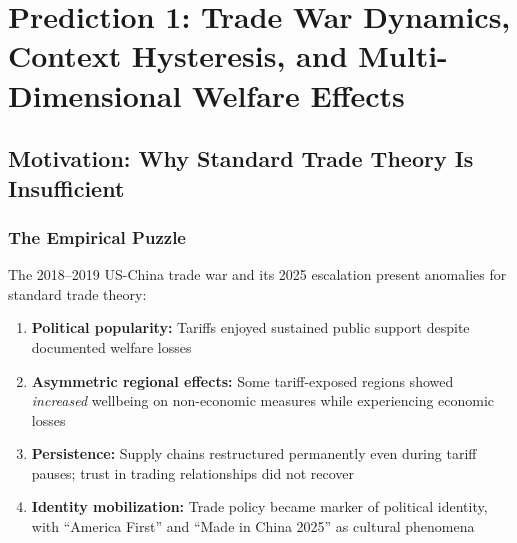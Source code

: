 \section{Prediction 1: Trade War Dynamics, Context Hysteresis, and Multi-Dimensional Welfare Effects}
\label{app:prediction-tradewar}


\begin{abstract}
This appendix provides the complete technical foundation for Prediction 1 of the 
Complementarity-Context Framework: that trade wars produce persistent welfare effects 
through context ($\Psi$) shifts that outlast the tariffs themselves. We develop the 
formal model, derive quantitative predictions using the $\Gamma$-matrix, present 
empirical validation from the 2018--2025 US-China trade conflict, and establish 
falsification criteria. The analysis demonstrates how the framework generates 
novel, testable predictions unavailable to standard trade theory.
\end{abstract}

\subsection{Motivation: Why Standard Trade Theory Is Insufficient}

\subsubsection{The Empirical Puzzle}

The 2018--2019 US-China trade war and its 2025 escalation present anomalies 
for standard trade theory:

\begin{enumerate}
    \item \textbf{Political popularity:} Tariffs enjoyed sustained public support 
    despite documented welfare losses \citep{amiti2019impact, fajgelbaum2020return}
    
    \item \textbf{Asymmetric regional effects:} Some tariff-exposed regions showed 
    \emph{increased} wellbeing on non-economic measures while experiencing economic losses
    
    \item \textbf{Persistence:} Supply chains restructured permanently even during 
    tariff pauses; trust in trading relationships did not recover
    
    \item \textbf{Identity mobilization:} Trade policy became marker of political 
    identity, with ``America First'' and ``Made in China 2025'' as cultural phenomena
\end{enumerate}

